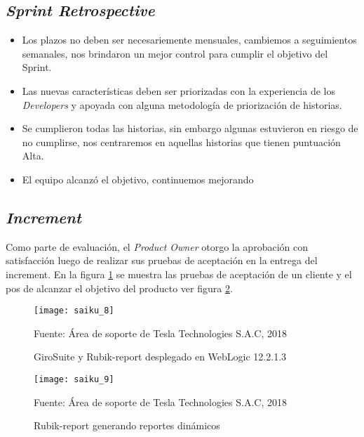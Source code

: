 \begin{spacing}{1.5}
			
	\subsection{\textit{Sprint Retrospective}}
	\begin{itemize}
		\item Los plazos no deben ser necesariemente mensuales, cambiemos a seguimientos semanales, nos brindaron un mejor control para cumplir el objetivo del Sprint.
		\item Las nuevas caracter\'{i}sticas deben ser priorizadas con la experiencia de los \textit{Developers} y apoyada con alguna metodolog\'{i}a de priorizaci\'{o}n de historias.
		\item Se cumplieron todas las historias, sin embargo algunas estuvieron en riesgo de no cumplirse, nos centraremos en aquellas historias que tienen puntuaci\'{o}n Alta.
		\item El equipo alcanz\'{o} el objetivo, continuemos mejorando
	\end{itemize}

	\subsection{\textit{Increment}}
	Como parte de evaluaci\'{o}n, el \textit{Product Owner} otorgo la aprobaci\'{o}n con satisfacci\'{o}n luego de realizar sus pruebas de aceptaci\'{o}n en la entrega del increment.
	En la figura \ref{figure:chaperIII_11} se muestra las pruebas de aceptaci\'{o}n de un cliente y el pos de alcanzar el objetivo del producto ver figura \ref{figure:chaperIII_12}.
	
	\begin{figure}[H]
		\centering
		\texttt{[image: saiku\_8]}
		\caption {\centering \small{GiroSuite y Rubik-report desplegado en WebLogic 12.2.1.3}} \label{figure:chaperIII_11}
		\small {Fuente: \'{A}rea de soporte de Tesla Technologies S.A.C, 2018}
	\end{figure}
	
		\begin{figure}[H]
		\centering
		\texttt{[image: saiku\_9]}
		\caption {\centering \small{Rubik-report generando reportes din\'{a}micos}} \label{figure:chaperIII_12}
		\small {Fuente: \'{A}rea de soporte de Tesla Technologies S.A.C, 2018}
	\end{figure}	
	
	
	
\end{spacing}